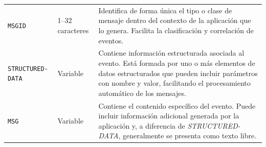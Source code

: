 \begin{longtable}{p{3.0cm} p{2.0cm} p{10cm}}
    \texttt{MSGID} &
    1--32 caracteres &
    Identifica de forma única el tipo o clase de mensaje dentro del contexto
    de la aplicación que lo genera. Facilita la clasificación y correlación
    de eventos. \\

    \texttt{STRUCTURED-DATA} &
    Variable &
    Contiene información estructurada asociada al evento. Está formada por
    uno o más elementos de datos estructurados que pueden incluir parámetros
    con nombre y valor, facilitando el procesamiento automático de los
    mensajes. \\

    \texttt{MSG} &
    Variable &
    Contiene el contenido específico del evento. Puede incluir información
    adicional generada por la aplicación y, a diferencia de
    \textit{STRUCTURED-DATA}, generalmente se presenta como texto libre.

\end{longtable}
